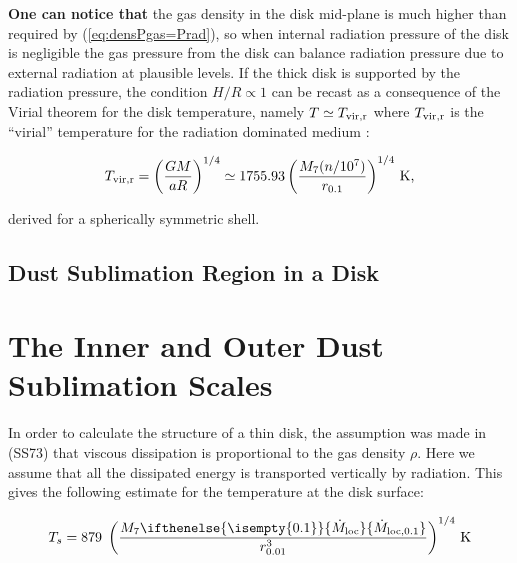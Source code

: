 \documentclass[12pt,english,preprint]{aastex}
\newcommand{\mybf}{\bf}
\newcommand{\su}[2]{#1_{\rm #2}}
\newcommand{\mdt}[1][]{ 
  \ifthenelse{\isempty{#1}}
  {\dot{M}_{\rm loc}}
  { {\dot M}_{\rm{loc},{#1}} } 
  } %
\newcommand{\mdtcr}{\su{\dot{M}}{loc,cr} }
\begin{document}

{\mybf One can notice that}
the gas density in the disk mid-plane is much higher than required by 
(\ref{eq:densPgas=Prad}), so when internal radiation pressure
of the disk is negligible the gas pressure from the disk 
can balance radiation pressure due to external radiation at plausible levels.
If the thick disk is supported by the radiation pressure, the condition
$H/R\propto1$ can be recast as a consequence of the Virial theorem
for the disk temperature, namely $T\simeq T_{{\rm vir,r}}$ where
$T_{{\rm vir,r}}$ is the ``virial'' temperature for the radiation
dominated medium \citep{Dorodnitsyn11a}:

\begin{equation}
T_{{\rm vir,r}}=\left(\frac{GM}{a R}\right)^{1/4}
\simeq 1755.93 \left(\frac{M_{7}(n/10^7)}{r_{0.1}}\right)^{1/4}{\rm \,K}\mbox{,}
\label{eq:TvirRad}
\end{equation}

\noindent derived for a spherically symmetric shell. 


\subsection{Dust Sublimation Region in a Disk}\label{sec:DustSubRegIndisk}



\section{The Inner and Outer Dust Sublimation Scales}

In order to calculate the structure of a thin disk,  the
assumption was made in (SS73) that viscous dissipation is proportional
to the gas density $\rho$.  Here we assume that all the dissipated energy is transported vertically
by radiation. This gives the following estimate for the temperature
at the disk surface:

\begin{equation}
T_s=879\;\left(\frac{M_{7}\mdt[0.1]}{r_{0.01}^{3}}\right)^{1/4}\text{\,K}\label{eq:Teff}
\end{equation}
\end{document}
